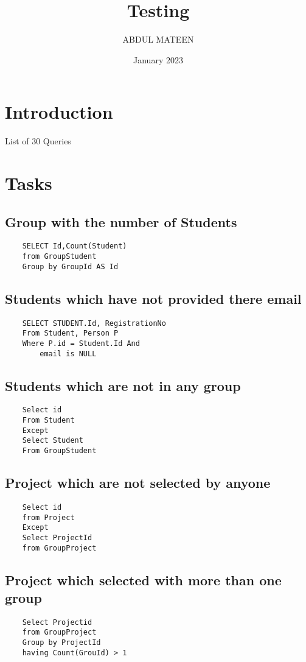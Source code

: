 \documentclass{article}
\title{Testing}
\author{ABDUL MATEEN}
\date{January 2023}
\begin{document}
\maketitle

\section{Introduction}
\indent \indent List of 30 Queries

\section{Tasks}

\subsection{Group with the number of Students}
\begin{lstlisting}
    SELECT Id,Count(Student)
    from GroupStudent
    Group by GroupId AS Id
\end{lstlisting}

\subsection{Students which have not provided there email}
\begin{lstlisting}
    SELECT STUDENT.Id, RegistrationNo
    From Student, Person P
    Where P.id = Student.Id And
        email is NULL
\end{lstlisting}

\subsection{Students which are not in any group}
\begin{lstlisting}
    Select id
    From Student
    Except
    Select Student 
    From GroupStudent
\end{lstlisting}

\subsection{Project which are not selected by anyone}
\begin{lstlisting}
    Select id
    from Project
    Except
    Select ProjectId
    from GroupProject
\end{lstlisting}

\subsection{Project which selected with more than one group}
\begin{lstlisting}
    Select Projectid
    from GroupProject
    Group by ProjectId
    having Count(GrouId) > 1
\end{lstlisting}
\end{document}
